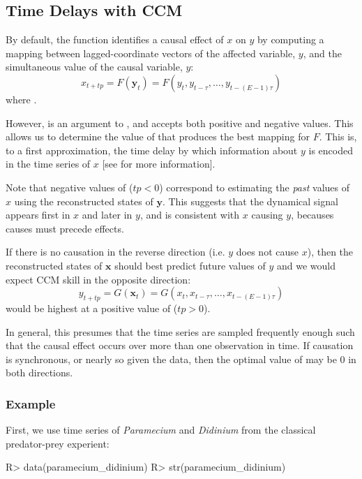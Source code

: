 \documentclass[article]{jss}
\begin{document}
\subsection{Time Delays with CCM}\label{sec:ccm-time-delays}

By default, the  function identifies a causal effect of $x$ on $y$ by computing a mapping between lagged-coordinate vectors of the affected variable, $y$, and the simultaneous value of the causal variable, $y$:
\begin{equation}
x_{t+tp} = F\left(\mathbf{y}_t\right) = F\left(y_t, y_{t-\tau}, \dots, y_{t-(E-1)\tau} \right)
\end{equation}
where .

However,  is an argument to , and accepts both positive and negative values. This allows us to determine the value of  that produces the best mapping for $F$. This is, to a first approximation, the time delay by which information about $y$ is encoded in the time series of $x$ [see \citet{Ye_2015a} for more information].

Note that negative values of  ($tp < 0$) correspond to estimating the \emph{past} values of $x$ using the reconstructed states of $\mathbf{y}$. This suggests that the dynamical signal appears first in $x$ and later in $y$, and is consistent with $x$ causing $y$, becauses causes must precede effects.

If there is no causation in the reverse direction (i.e. $y$ does not cause $x$), then the reconstructed states of $\mathbf{x}$ should best predict future values of $y$ and we would expect CCM skill in the opposite direction:
$$ y_{t+tp} = G\left(\mathbf{x}_t\right) = G\left(x_t, x_{t-\tau}, \dots, x_{t-(E-1)\tau} \right) $$
would be highest at a positive value of  ($tp > 0$).

In general, this presumes that the time series are sampled frequently enough such that the causal effect occurs over more than one observation in time. If causation is synchronous, or nearly so given the data, then the optimal value of  may be $0$ in both directions.

\subsubsection{Example}\label{sec:ccm-time-delays-example}

First, we use time series of \emph{Paramecium} and \emph{Didinium} from the classical predator-prey experient:
\begin{Schunk}
\begin{Sinput}
R> data(paramecium_didinium)
R> str(paramecium_didinium)
\end{Sinput}
\end{Schunk}
\end{document}
